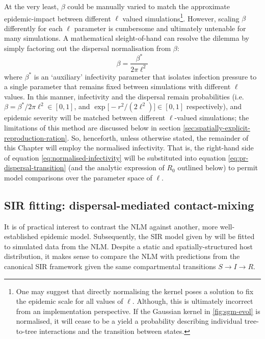At the very least, $\beta$ could be manually varied to match the approximate epidemic-impact between different $\ell$ valued simulations\footnote{One may suggest that directly normalising the kernel poses a solution to fix the epidemic scale for all values of $\ell$.
Although, this is ultimately incorrect from an implementation perspective. 
If the Gaussian kernel in \ref{fig:sgm-evol} is normalised, it will cease to be a yield a probability describing individual tree-to-tree interactions and the transition between states.}. 
However, scaling $\beta$ differently for each $\ell$ parameter is cumbersome and ultimately untenable for many simulations.
A mathematical sleight-of-hand can resolve the dilemma by simply factoring out the dispersal normalisation from $\beta$:
\begin{equation}
    \beta = \frac{\beta^*}{2\pi\ell^2}
    \label{eq:normalised-infectivity}
\end{equation}
where $\beta^*$ is an `auxiliary' infectivity parameter that isolates infection pressure to a single parameter that remains fixed between simulations with different $\ell$ values.
In this manner, infectivity and the dispersal remain probabilities (i.e. $\beta=\beta^*/2\pi\ell^2 \in [0, 1]$, and $\exp\big[-r^2/(2\ell^2)\big] \in [0, 1]$ respectively), and epidemic severity will be matched between different $\ell$-valued simulations; the limitations of this method are discussed below in section \ref{sec:spatially-explicit-reproduction-ration}.
So, henceforth, unless otherwise stated, the remainder of this Chapter will employ the normalised infectivity.
That is, the right-hand side of equation \ref{eq:normalised-infectivity} will be substituted into equation \ref{eq:pr-dispersal-transition} (and the analytic expression of $R_0$ outlined below) to permit model comparisons over the parameter space of $\ell$.

\subsection{SIR fitting: dispersal-mediated contact-mixing}
\label{sec:SIR-fitting}

It is of practical interest to contrast the NLM against another, more well-established epidemic model.
Subsequently, the SIR model given by \cite{kermack-model} will be fitted to simulated data from the NLM.
Despite a static and spatially-structured host distribution, it makes sense to compare the NLM with predictions from the canonical SIR framework given the same compartmental transitions $S \rightarrow I \rightarrow R$.

